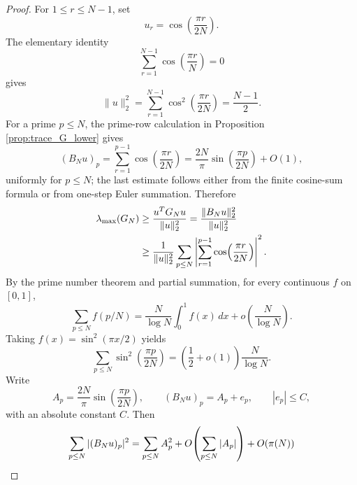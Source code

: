 \documentclass[11pt]{amsart}
\numberwithin{equation}{section}
\theoremstyle{plain}
\theoremstyle{definition}
\theoremstyle{remark}
\begin{document}
\begin{proof}
For $1\le r\le N-1$, set
\begin{equation}
u_r=\cos\!\left(\frac{\pi r}{2N}\right).
\label{eq:cosine_test_vector}
\end{equation}
The elementary identity
\begin{equation}
\sum_{r=1}^{N-1}\cos\!\left(\frac{\pi r}{N}\right)=0
\end{equation}
gives
\begin{equation}
\|u\|_2^2
=\sum_{r=1}^{N-1}\cos^2\!\left(\frac{\pi r}{2N}\right)
=\frac{N-1}{2}.
\label{eq:cosine_test_norm}
\end{equation}
For a prime $p\le N$, the prime-row calculation in Proposition \ref{prop:trace_G_lower} gives
\begin{equation}
(B_Nu)_p
=\sum_{r=1}^{p-1}\cos\!\left(\frac{\pi r}{2N}\right)
=\frac{2N}{\pi}\sin\!\left(\frac{\pi p}{2N}\right)+O(1),
\label{eq:prime_row_cosine_sum}
\end{equation}
uniformly for $p\le N$; the last estimate follows either from the finite cosine-sum formula or from one-step Euler summation.  Therefore
\begin{align}
\lambda_{\max}(G_N)
&\ge \frac{u^TG_Nu}{\|u\|_2^2}
=\frac{\|B_Nu\|_2^2}{\|u\|_2^2}\notag\\
&\ge
\frac{1}{\|u\|_2^2}
\sum_{p\le N}
\left|\sum_{r=1}^{p-1}\cos\!\left(\frac{\pi r}{2N}\right)\right|^2.
\label{eq:prime_rayleigh_quotient}
\end{align}
By the prime number theorem and partial summation, for every continuous $f$ on $[0,1]$,
\begin{equation}
\sum_{p\le N}f(p/N)
=\frac{N}{\log N}\int_0^1f(x)\,dx
+o\!\left(\frac{N}{\log N}\right).
\label{eq:weighted_pnt_riemann}
\end{equation}
Taking $f(x)=\sin^2(\pi x/2)$ yields
\begin{equation}
\sum_{p\le N}\sin^2\!\left(\frac{\pi p}{2N}\right)
=\left(\frac12+o(1)\right)\frac{N}{\log N}.
\label{eq:prime_sine_square_sum}
\end{equation}
Write
\begin{equation}
A_p=\frac{2N}{\pi}\sin\!\left(\frac{\pi p}{2N}\right),
\qquad
(B_Nu)_p=A_p+e_p,
\qquad |e_p|\le C,
\end{equation}
with an absolute constant $C$.  Then
\begin{align}
\sum_{p\le N}|(B_Nu)_p|^2
&=\sum_{p\le N}A_p^2
 +O\!\left(\sum_{p\le N}|A_p|\right)
 +O(\pi(N))\notag\\

\end{align}
\end{proof}
\end{document}
